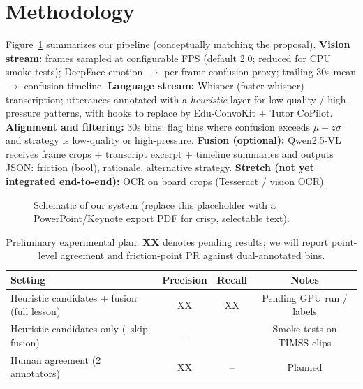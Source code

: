 \documentclass[11pt]{article}
\begin{document}
\section{Methodology}
Figure~\ref{fig:pipeline} summarizes our pipeline (conceptually matching the proposal). \textbf{Vision stream:} frames sampled at configurable FPS (default 2.0; reduced for CPU smoke tests); DeepFace emotion $\rightarrow$ per-frame confusion proxy; trailing 30s mean $\rightarrow$ confusion timeline. \textbf{Language stream:} Whisper (faster-whisper) transcription; utterances annotated with a \emph{heuristic} layer for low-quality / high-pressure patterns, with hooks to replace by Edu-ConvoKit + Tutor CoPilot. \textbf{Alignment and filtering:} 30s bins; flag bins where confusion exceeds $\mu + z\sigma$ and strategy is low-quality or high-pressure. \textbf{Fusion (optional):} Qwen2.5-VL receives frame crops + transcript excerpt + timeline summaries and outputs JSON: friction (bool), rationale, alternative strategy. \textbf{Stretch (not yet integrated end-to-end):} OCR on board crops (Tesseract / vision OCR).

\begin{figure}[ht]
\centering
{}
\caption{Schematic of our system (replace this placeholder with a PowerPoint/Keynote export PDF for crisp, selectable text).}
\label{fig:pipeline}
\end{figure}

\begin{table}[ht]
\centering
\small
\begin{tabular}{lccc}
\hline
Setting & Precision & Recall & Notes \\
\hline
Heuristic candidates + fusion (full lesson) & XX & XX & Pending GPU run / labels \\
Heuristic candidates only (--skip-fusion) & -- & -- & Smoke tests on TIMSS clips \\
Human agreement (2 annotators) & XX & -- & Planned \\
\hline
\end{tabular}
\caption{Preliminary experimental plan. \textbf{XX} denotes pending results; we will report point-level agreement and friction-point PR against dual-annotated bins.}
\end{table}
\end{document}
